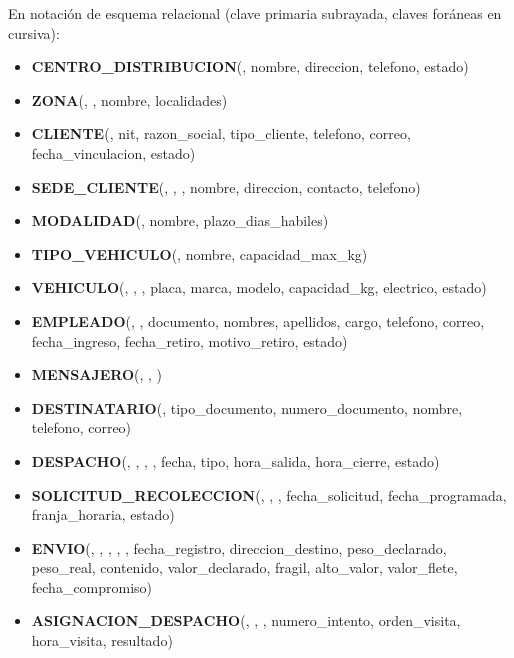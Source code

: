 En notación de esquema relacional (clave primaria subrayada, claves
foráneas en cursiva):

{\singlespacing\small\sloppy
\begin{itemize}[leftmargin=0.6cm,itemsep=3pt,label={}]
  \item \textbf{CENTRO\_DISTRIBUCION}(, nombre, direccion, telefono, estado)
  \item \textbf{ZONA}(, , nombre, localidades)
  \item \textbf{CLIENTE}(, nit, razon\_social, tipo\_cliente, telefono, correo, fecha\_vinculacion, estado)
  \item \textbf{SEDE\_CLIENTE}(, , , nombre, direccion, contacto, telefono)
  \item \textbf{MODALIDAD}(, nombre, plazo\_dias\_habiles)
  \item \textbf{TIPO\_VEHICULO}(, nombre, capacidad\_max\_kg)
  \item \textbf{VEHICULO}(, , , placa, marca, modelo, capacidad\_kg, electrico, estado)
  \item \textbf{EMPLEADO}(, , documento, nombres, apellidos, cargo, telefono, correo, fecha\_ingreso, fecha\_retiro, motivo\_retiro, estado)
  \item \textbf{MENSAJERO}(, , )
  \item \textbf{DESTINATARIO}(, tipo\_documento, numero\_documento, nombre, telefono, correo)
  \item \textbf{DESPACHO}(, , , , fecha, tipo, hora\_salida, hora\_cierre, estado)
  \item \textbf{SOLICITUD\_RECOLECCION}(, , , fecha\_solicitud, fecha\_programada, franja\_horaria, estado)
  \item \textbf{ENVIO}(, , , , , fecha\_registro, direccion\_destino, peso\_declarado, peso\_real, contenido, valor\_declarado, fragil, alto\_valor, valor\_flete, fecha\_compromiso)
  \item \textbf{ASIGNACION\_DESPACHO}(, , , numero\_intento, orden\_visita, hora\_visita, resultado)

\end{itemize}}
